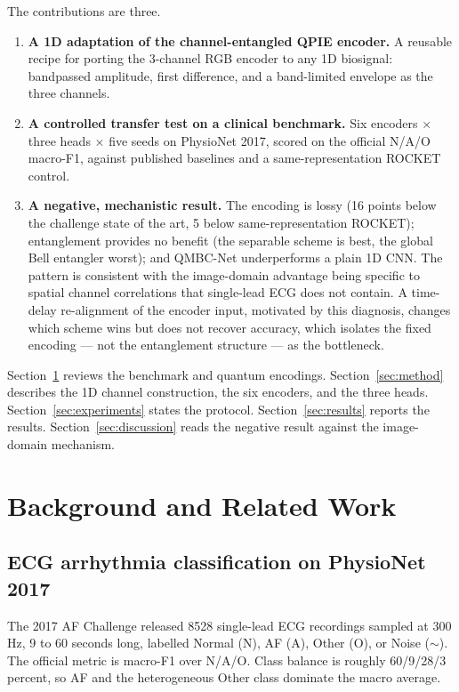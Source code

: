 \documentclass[conference,compsoc]{IEEEtran}
\begin{document}
The contributions are three.
\begin{enumerate}
    \item \textbf{A 1D adaptation of the channel-entangled QPIE encoder.} A reusable recipe for porting the 3-channel RGB encoder to any 1D biosignal: bandpassed amplitude, first difference, and a band-limited envelope as the three channels.
    \item \textbf{A controlled transfer test on a clinical benchmark.} Six encoders $\times$ three heads $\times$ five seeds on PhysioNet 2017, scored on the official N/A/O macro-F1, against published baselines and a same-representation ROCKET control.
    \item \textbf{A negative, mechanistic result.} The encoding is lossy (16 points below the challenge state of the art, 5 below same-representation ROCKET); entanglement provides no benefit (the separable scheme is best, the global Bell entangler worst); and QMBC-Net underperforms a plain 1D CNN. The pattern is consistent with the image-domain advantage being specific to spatial channel correlations that single-lead ECG does not contain. A time-delay re-alignment of the encoder input, motivated by this diagnosis, changes which scheme wins but does not recover accuracy, which isolates the fixed encoding --- not the entanglement structure --- as the bottleneck.
\end{enumerate}

Section~\ref{sec:background} reviews the benchmark and quantum encodings. Section~\ref{sec:method} describes the 1D channel construction, the six encoders, and the three heads. Section~\ref{sec:experiments} states the protocol. Section~\ref{sec:results} reports the results. Section~\ref{sec:discussion} reads the negative result against the image-domain mechanism.

\section{Background and Related Work}
\label{sec:background}

\subsection{ECG arrhythmia classification on PhysioNet 2017}

The 2017 AF Challenge released 8528 single-lead ECG recordings sampled at 300\,Hz, 9 to 60 seconds long, labelled Normal (N), AF (A), Other (O), or Noise ($\sim$). The official metric is macro-F1 over N/A/O. Class balance is roughly 60/9/28/3 percent, so AF and the heterogeneous Other class dominate the macro average.
\end{document}
